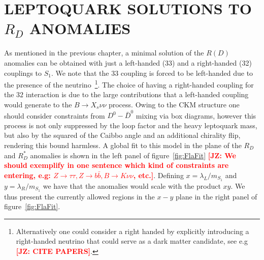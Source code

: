 \documentclass[11pt]{cernrep}
\def\sss{\scriptscriptstyle}
\def\JZ#1{{\bf  \textcolor{red}{[JZ: {#1}]}}}
\begin{document}


\section{LEPTOQUARK SOLUTIONS TO  $R_D$ ANOMALIES}
As mentioned in the previous chapter, a minimal solution of the $R(D)$ anomalies can be obtained with just a left-handed (33) and a right-handed (32) couplings to $S_1$. We note that the $33$ coupling is forced to be left-handed due to the presence of the neutrino~\footnote{Alternatively one could consider a right handed by explicitly introducing a right-handed neutrino that could serve as a dark matter candidate, see e.g~\cite{} \JZ{CITE PAPERS}.}. The choice of having a right-handed coupling for the $32$ interaction is due to the large contributions that a left-handed coupling would generate to the $B \to X_s \nu \nu$ process. Owing to the CKM structure one should consider constraints from $D^0 - \bar{D}^0$ mixing via box diagrams, however this process is not only suppressed by the loop factor and the heavy leptoquark mass, but also by the squared of the Caibbo angle and an additional chirality flip, rendering this bound harmless. A global fit to this model in the plane of the $R_D$ and $R_D^*$ anomalies is shown in the left panel of figure~\ref{fig:FlaFit} \JZ{We should exemplify in one sentence which kind of constraints are entering, e.g: $Z \to \tau \tau, Z \to b \bar{b}, B \to K \nu \nu$, etc.}. Defining $x= \lambda_L / m_{S_1}$ and $y= \lambda_R / m_{S_1}$ we have that the anomalies would scale with the product $xy$.  We thus present the currently allowed regions in the $x-y$ plane in the right panel of figure~\ref{fig:FlaFit}.
\end{document}
